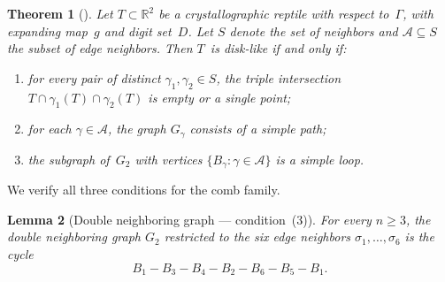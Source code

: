 \documentclass{amsart}
\newtheorem{theorem}{Theorem}[section]
\newtheorem{lemma}[theorem]{Lemma}
\theoremstyle{definition}
\theoremstyle{remark}
\newcommand{\R}{\mathbb{R}}
\begin{document}
\begin{theorem}[{\cite[Theorem~4.2]{loridant-luo-thuswaldner}}]%
\label{thm:disklike-criterion}
Let $T \subset \R^2$ be a crystallographic reptile with respect
to~$\Gamma$, with expanding map~$g$ and digit set~$D$.
Let $S$ denote the set of neighbors and $\mathcal{A} \subseteq S$ the
subset of edge neighbors.  Then $T$~is disk-like if and only if:
\begin{enumerate}
\item[\rm(1)] for every pair of distinct $\gamma_1, \gamma_2 \in S$,
  the triple intersection
  $T \cap \gamma_1(T) \cap \gamma_2(T)$ is empty or a single point;
\item[\rm(2)] for each $\gamma \in \mathcal{A}$, the graph $G_\gamma$
  consists of a simple path;
\item[\rm(3)] the subgraph of~$G_2$ with
  vertices $\{B_\gamma : \gamma \in \mathcal{A}\}$ is a simple loop.
\end{enumerate}
\end{theorem}

We verify all three conditions for the comb family.

\begin{lemma}[Double neighboring graph --- condition~(3)]%
\label{lem:simple-loop}
For every $n \ge 3$, the double neighboring graph $G_2$ restricted to
the six edge neighbors $\sigma_1, \ldots, \sigma_6$ is the cycle
\[
  B_1 - B_3 - B_4 - B_2 - B_6 - B_5 - B_1.
\]
\end{lemma}
\end{document}
